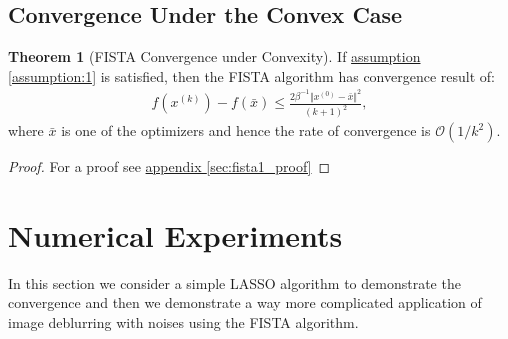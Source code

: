 \documentclass[]{article}
\theoremstyle{definition}
\newtheorem{theorem}{Theorem}       %
\begin{document}
    \subsection{Convergence Under the Convex Case}
        \begin{theorem}[FISTA Convergence under Convexity]\label{thm:fista_convergence1}
            If \hyperref[assumption:1]{assumption \ref*{assumption:1}} is satisfied, then the FISTA algorithm has convergence result of: 
            \begin{align*}
                f(x^{(k)}) - f(\bar x) \le 
                \frac{2\beta^{-1}\Vert x^{(0)} - \bar x\Vert^2}
            {(k + 1)^2},
            \end{align*}
            where $\bar x$ is one of the optimizers and hence the rate of convergence is $\mathcal O(1/k^2)$. 
        \end{theorem}
        \begin{proof}
            For a proof see \hyperref[sec:fista1_proof]{appendix \ref*{sec:fista1_proof}}
        \end{proof}

\section{Numerical Experiments}\label{sec:numerical_experiments}
    In this section we consider a simple LASSO algorithm to demonstrate the convergence and then we demonstrate a way more complicated application of image deblurring with noises using the FISTA algorithm. 
\end{document}
